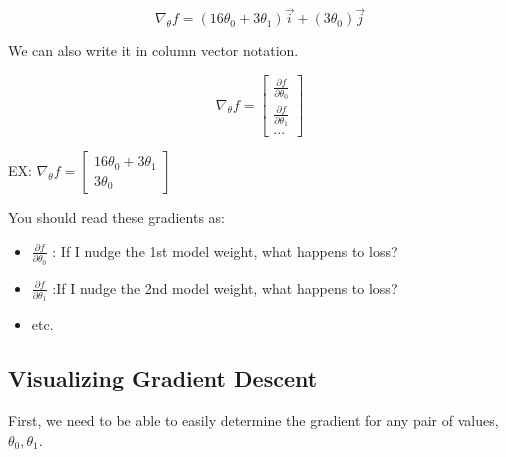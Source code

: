 \documentclass[
  letterpaper,
  DIV=11,
  numbers=noendperiod]{scrreprt}
\providecommand{\tightlist}{%
  \setlength{\itemsep}{0pt}\setlength{\parskip}{0pt}}\usepackage{longtable,booktabs,array}
\begin{document}
\[\nabla_\theta f =  (16\theta_0 + 3\theta_1)\vec{i} + (3\theta_0)\vec{j}\]

We can also write it in column vector notation.

\[\nabla_\theta f =  \begin{bmatrix} \frac{\partial f}{\partial \theta_0} \\ \frac{\partial f}{\partial \theta_1} \\... \end{bmatrix}\]

EX:
\(\nabla_\theta f = \begin{bmatrix}16\theta_0 + 3\theta_1 \\ 3\theta_0\end{bmatrix}\)

You should read these gradients as:

\begin{itemize}
\tightlist
\item
  \(\frac{\partial f}{\partial \theta_0}\) : If I nudge the 1st model
  weight, what happens to loss?
\item
  \(\frac{\partial f}{\partial \theta_1}\) :If I nudge the 2nd model
  weight, what happens to loss?
\item
  etc.
\end{itemize}

\hypertarget{visualizing-gradient-descent}{%
\subsection{Visualizing Gradient
Descent}\label{visualizing-gradient-descent}}

First, we need to be able to easily determine the gradient for any pair
of values, \(\theta_0, \theta_1\).
\end{document}

